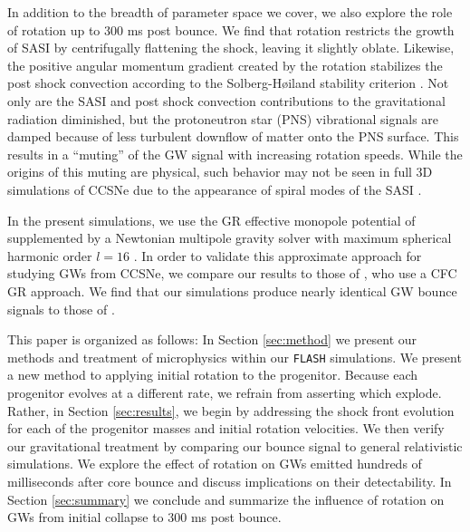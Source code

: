 \documentclass[twocolumn,times]{aastex62}  %
\begin{document}

In addition to the breadth of parameter space we cover, we also explore the role of rotation up to 300 ms post bounce.  
We find that rotation restricts the growth of SASI by centrifugally flattening the shock, leaving it slightly oblate. Likewise, the positive angular momentum gradient created by the rotation stabilizes the post shock convection according to the Solberg-H{\o}iland stability criterion \citep{endal:1978,fryer:2000}.  Not only are the SASI and post shock convection contributions to the gravitational radiation diminished, but the protoneutron star (PNS) vibrational signals are damped because of less turbulent downflow of matter onto the PNS surface.  
This results in a ``muting'' of the GW signal with increasing rotation speeds.
While the origins of this muting are physical, such behavior may not be seen in full 3D simulations of CCSNe due to the appearance of spiral modes of the SASI \citep{andresen:2018}. 

In the present simulations, we use the GR effective monopole potential of \citet{marek:2006} supplemented by a Newtonian multipole gravity solver with maximum spherical harmonic order $l=16$ \citep{couch:2013a, oconnor:2018}.
In order to validate this approximate approach for studying GWs from CCSNe, we compare our results to those of \citet{richers:2017}, who use a CFC GR approach.  We find that our simulations produce nearly identical GW bounce signals to those of \citet{richers:2017}.  

This paper is organized as follows:  In Section \ref{sec:method} we present our methods and treatment of microphysics within our \texttt{FLASH} simulations.  We present a new method to applying initial rotation to the progenitor.  Because each progenitor evolves at a different rate, we refrain from asserting which explode.  Rather, in Section \ref{sec:results}, we begin by addressing the shock front evolution for each of the progenitor masses and initial rotation velocities.  We then verify our gravitational treatment by comparing our bounce signal to general relativistic simulations.  We explore the effect of rotation on GWs emitted hundreds of milliseconds after core bounce and discuss implications on their detectability.  In Section \ref{sec:summary} we conclude and summarize the influence of rotation on GWs from initial collapse to 300 ms post bounce. 
\end{document}
